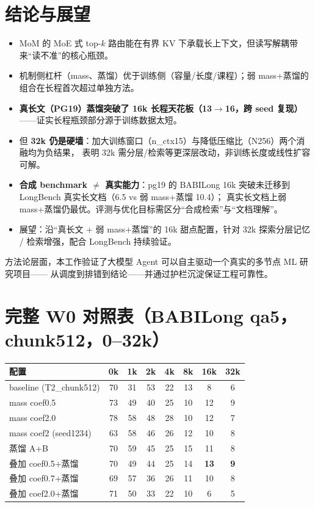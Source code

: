 \documentclass[11pt,a4paper]{ctexart}
\begin{document}
\section{结论与展望}
\begin{itemize}
  \item MoM 的 MoE 式 top-$k$ 路由能在有界 KV 下承载长上下文，但读写解耦带来“读不准”的核心瓶颈。
  \item 机制侧杠杆（mass、蒸馏）优于训练侧（容量/长度/课程）；弱 mass+蒸馏的组合在长程首次超过单独方法。
  \item \textbf{真长文（PG19）蒸馏突破了 16k 长程天花板（13$\to$16，跨 seed 复现）}——证实长程瓶颈部分源于训练数据太短。
  \item 但 \textbf{32k 仍是硬墙}：加大训练窗口（n\_ctx15）与降低压缩比（N256）两个消融均为负结果，
        表明 32k 需分层/检索等更深层改动，非训练长度或线性扩容可解。
  \item \textbf{合成 benchmark $\ne$ 真实能力}：pg19 的 BABILong 16k 突破未迁移到 LongBench 真实长文档（6.5 vs 弱 mass+蒸馏 10.4）；
        真实长文档上弱 mass+蒸馏仍最优。评测与优化目标需区分“合成检索”与“文档理解”。
  \item 展望：沿“真长文 + 弱 mass+蒸馏”的 16k 甜点配置，针对 32k 探索分层记忆 / 检索增强，配合 LongBench 持续验证。
\end{itemize}
方法论层面，本工作验证了大模型 Agent 可以自主驱动一个真实的多节点 ML 研究项目——
从调度到排错到结论——并通过护栏沉淀保证工程可靠性。

\appendix
\newpage
\section{完整 W0 对照表（BABILong qa5，chunk512，0--32k）}
\begin{center}\small
\begin{tabular}{lccccccc}
\toprule
\textbf{配置} & \textbf{0k} & \textbf{1k} & \textbf{2k} & \textbf{4k} & \textbf{8k} & \textbf{16k} & \textbf{32k}\\
\midrule
baseline (T2\_chunk512) & 70 & 31 & 53 & 22 & 13 & 8 & 6\\
mass coef0.5 & 73 & 49 & 40 & 25 & 10 & 12 & 9\\
mass coef2.0 & 78 & 58 & 48 & 28 & 10 & 12 & 7\\
mass coef2 (seed1234) & 63 & 58 & 46 & 26 & 12 & 10 & 8\\
蒸馏 A+B & 70 & 59 & 45 & 25 & 15 & 11 & 8\\
叠加 coef0.5+蒸馏 & 70 & 49 & 44 & 25 & 14 & \textbf{13} & \textbf{9}\\
叠加 coef0.7+蒸馏 & 69 & 57 & 36 & 26 & 11 & 10 & 8\\
叠加 coef2.0+蒸馏 & 71 & 50 & 33 & 22 & 10 & 6 & 5\\
\bottomrule
\end{tabular}
\end{center}
\end{document}
